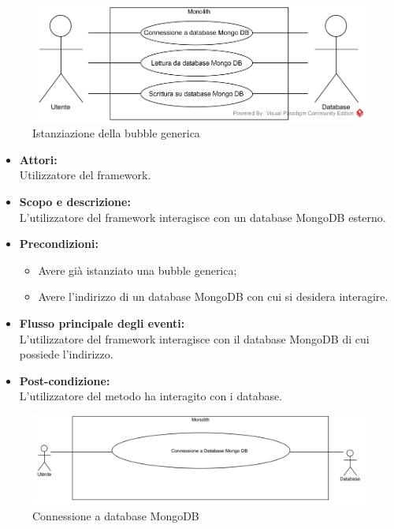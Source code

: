 
\begin{figure}[H]
	\centering
	\includegraphics[width=15cm]{../../documenti/AnalisiDeiRequisiti/Diagrammi_img/Database.png}
	\caption{\UCCaption{} Istanziazione della bubble generica}
\end{figure}

\begin{itemize}
	\item \textbf{Attori:}
	\\Utilizzatore del framework.
	\item \textbf{Scopo e descrizione:} 
	\\L'utilizzatore del framework interagisce con un database MongoDB esterno.
	\item \textbf{Precondizioni:}
	\begin{itemize}
		\item Avere già istanziato una bubble generica;
		\item Avere l'indirizzo di un database MongoDB con cui si desidera interagire.
	\end{itemize}
	\item \textbf{Flusso principale degli eventi:}
	\\L'utilizzatore del framework interagisce con il database MongoDB di cui possiede l'indirizzo.
	\item \textbf{Post-condizione:}
	\\L'utilizzatore del metodo ha interagito con i database.
\end{itemize}


\begin{figure}[H]
	\centering
	\includegraphics[width=15cm]{../../documenti/AnalisiDeiRequisiti/Diagrammi_img/uc1_00.png}
	\caption{\UCCaption{} Connessione a database MongoDB}
\end{figure}

